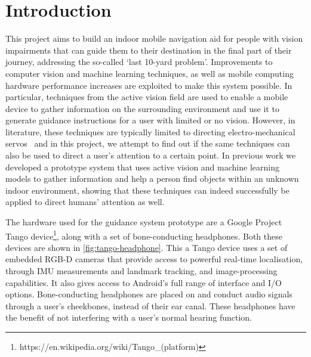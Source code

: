 \documentclass[acmsmall]{acmart}
\begin{document}


\maketitle

\section{Introduction}

This project aims to build an indoor mobile navigation aid for people with vision impairments that can guide them to their destination in the final part of their journey, addressing the so-called `last 10-yard problem'.
Improvements to computer vision and machine learning techniques, as well as mobile computing hardware performance increases are exploited to make this system possible.
In particular, techniques from the active vision field are used to enable a mobile device to gather information on the surrounding environment and use it to generate guidance instructions for a user with limited or no vision.
However, in literature, these techniques are typically limited to directing electro-mechanical servos~\citep{bajcsy2018revisiting} and in this project, we attempt to find out if the same techniques can also be used to direct a user's attention to a certain point. 
In previous work we developed a prototype system that uses active vision and machine learning models to gather information and help a person find objects within an unknown indoor environment, showing that these techniques can indeed successfully be applied to direct humans' attention as well\citep{lock2019active}.

The hardware used for the guidance system prototype are a Google Project Tango device\footnote{https://en.wikipedia.org/wiki/Tango\_(platform)}, along with a set of bone-conducting headphones.
Both these devices are shown in \cref{fig:tango-headphone}.
This a Tango device uses a set of embedded RGB-D cameras that provide access to powerful real-time localisation, through IMU measurements and landmark tracking, and image-processing capabilities.
It also gives access to Android's full range of interface and I/O options.
Bone-conducting headphones are placed on and conduct audio signals through a user's cheekbones, instead of their ear canal.
These headphones have the benefit of not interfering with a user's normal hearing function.
\end{document}
